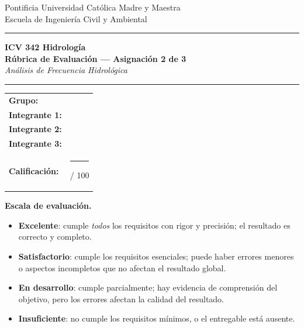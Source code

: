 \documentclass[11pt]{article}
\begin{document}
\begin{center}
  {\small\color{midgrey}
    Pontificia Universidad Católica Madre y Maestra\\
    Escuela de Ingeniería Civil y Ambiental}
  \vspace{0.9cm}
  {\color{teal}\rule{\linewidth}{2pt}}\vspace{0.3cm}
  {\Large\bfseries\color{darkblue} ICV 342 Hidrología}\\[0.3em]
  {\large\bfseries\color{darkblue} Rúbrica de Evaluación --- Asignación 2 de 3}\\[0.2em]
  {\normalsize\itshape Análisis de Frecuencia Hidrológica}
  \vspace{0.3cm}
  {\color{teal}\rule{\linewidth}{2pt}}
\end{center}
\vspace{0.4em}
\begin{center}
\begin{tabularx}{\textwidth}{lX}
\toprule
\textbf{Grupo:}        & \hrulefill \\[9pt]
\textbf{Integrante 1:} & \hrulefill \\[9pt]
\textbf{Integrante 2:} & \hrulefill \\[9pt]
\textbf{Integrante 3:} & \hrulefill \\[9pt]
\textbf{Calificación:} & \rule{2.5cm}{0.4pt}\;/ 100 \\
\bottomrule
\end{tabularx}
\end{center}
\vspace{0.5em}

\begin{tealbox}
\textbf{Escala de evaluación.}
\begin{itemize}
  \item \textbf{Excelente}: cumple \emph{todos} los requisitos con rigor
    y precisión; el resultado es correcto y completo.
  \item \textbf{Satisfactorio}: cumple los requisitos esenciales; puede haber
    errores menores o aspectos incompletos que no afectan el resultado global.
  \item \textbf{En desarrollo}: cumple parcialmente; hay evidencia de
    comprensión del objetivo, pero los errores afectan la calidad del resultado.
  \item \textbf{Insuficiente}: no cumple los requisitos mínimos,
    o el entregable está ausente.
\end{itemize}
\end{tealbox}
\end{document}
